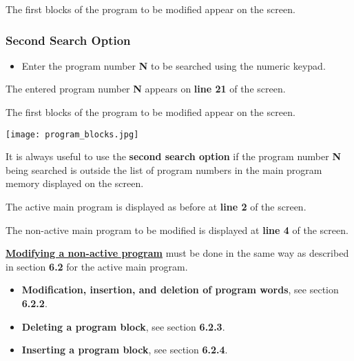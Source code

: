 \begin{itemize}
\end{itemize}

The first blocks of the program to be modified appear on the screen.
\newpage
\subsubsection*{Second Search Option}

\begin{itemize}
    \item Enter the program number \textbf{N} to be searched using the numeric keypad.
\end{itemize}

\begin{itemize}
\end{itemize}
\vspace{.5cm}
The entered program number \textbf{N} appears on \textbf{line 21} of the screen.

\begin{itemize}
\end{itemize}
\vspace{.5cm}
The first blocks of the program to be modified appear on the screen.

\begin{center}
    \texttt{[image: program\_blocks.jpg]}
\end{center}
\notes

It is always useful to use the \textbf{second search option} if the program number \textbf{N} being searched is outside the list of program numbers in the main program memory displayed on the screen.

The active main program is displayed as before at \textbf{line 2} of the screen.

The non-active main program to be modified is displayed at \textbf{line 4} of the screen.

\underline{\textbf{Modifying a non-active program}} must be done in the same way as described in section \textbf{6.2} for the active main program.

\begin{itemize}
    \item \textbf{Modification, insertion, and deletion of program words}, see section \textbf{6.2.2}.
    \item \textbf{Deleting a program block}, see section \textbf{6.2.3}.
    \item \textbf{Inserting a program block}, see section \textbf{6.2.4}.
\end{itemize}

